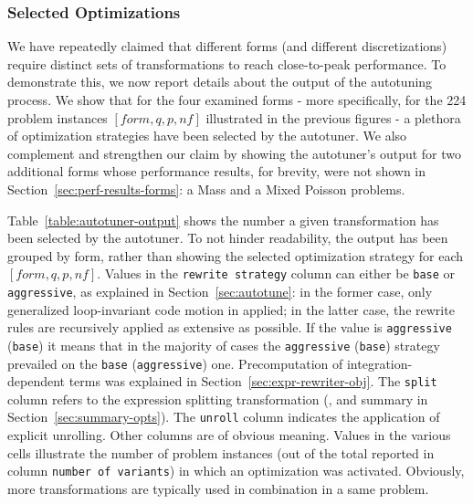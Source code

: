 \subsubsection{Selected Optimizations}
We have repeatedly claimed that different forms (and different discretizations) require distinct sets of transformations to reach close-to-peak performance. To demonstrate this, we now report details about the output of the autotuning process. We show that for the four examined forms - more specifically, for the 224 problem instances $[form, q, p, nf]$ illustrated in the previous figures - a plethora of optimization strategies have been selected by the autotuner. We also complement and strengthen our claim by showing the autotuner's output for two additional forms whose performance results, for brevity, were not shown in Section~\ref{sec:perf-results-forms}: a Mass and a Mixed Poisson problems. 

Table~\ref{table:autotuner-output} shows the number a given transformation has been selected by the autotuner. To not hinder readability, the output has been grouped by form, rather than showing the selected optimization strategy for each $[form, q, p, nf]$. Values in the \texttt{rewrite strategy} column can either be \texttt{base} or \texttt{aggressive}, as explained in Section~\ref{sec:autotune}: in the former case, only generalized loop-invariant code motion in applied; in the latter case, the rewrite rules are recursively applied as extensive as possible. If the value is \texttt{aggressive} (\texttt{base}) it means that in the majority of cases the \texttt{aggressive} (\texttt{base}) strategy prevailed on the \texttt{base} (\texttt{aggressive}) one. Precomputation of integration-dependent terms was explained in Section~\ref{sec:expr-rewriter-obj}. The \texttt{split} column refers to the expression splitting transformation (\cite{Luporini}, and summary in Section~\ref{sec:summary-opts}). The \texttt{unroll} column indicates the application of explicit unrolling. Other columns are of obvious meaning. Values in the various cells illustrate the number of problem instances (out of the total reported in column \texttt{number of variants}) in which an optimization was activated. Obviously, more transformations are typically used in combination in a same problem. 


